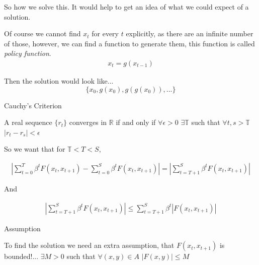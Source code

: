 \documentclass[aspectratio=169]{beamer}
\begin{document}
\begin{frame}
    So how we solve this. It would help to get an idea of what we could expect of a solution.
    
    Of course we cannot find $x_t$ for every $t$ explicitly, as there are an infinite number of those, however, we can find a function to generate them, this function is called \emph{policy function}.
    \begin{align*}
        x_t = g(x_{t-1})
    \end{align*}
    
    Then the solution would look like... $$\{x_0, g(x_0), g(g(x_0)),...\}$$
    
\end{frame}

\begin{frame}{Cauchy's Criterion}

A real sequence $\{r_t\}$ converges in $\mathds{R}$ if and only if $\forall \epsilon > 0$ $\exists \mathds{T}$ such that $\forall t,s>\mathds{T}$ $|r_t - r_s| < \epsilon$
    
\end{frame}

\begin{frame}

So we want that for $\mathds{T}<T<S$,

\begin{align*}
    \left|\sum_{t=0}^T\beta^t F(x_t,x_{t+1}) - \sum_{t=0}^S \beta^t F(x_t,x_{t+1})\right| = \left|\sum_{t=T+1}^S\beta^tF(x_t,x_{t+1})\right|
\end{align*}

And 

\begin{align*}
    \left|\sum_{t=T+1}^S\beta^tF(x_t,x_{t+1})\right| \leq \sum_{t=T+1}^S\beta^t |F(x_t,x_{t+1})|
\end{align*}

\end{frame}

\begin{frame}{Assumption}

To find the solution we need an extra assumption, that $F(x_t,x_{t+1})$ is bounded!... $\exists M>0$ such that $\forall (x,y)\in A$ $|F(x,y)|\leq M$ 
    
\end{frame}
\end{document}
